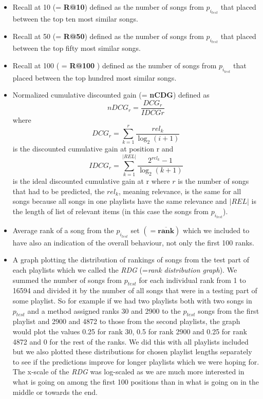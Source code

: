 \begin{itemize}
    \item Recall at 10 (= \textbf{R@10}) defined as the number of songs from $p_{i_{test}} $ that placed between the top ten most similar songs.
    \item Recall at 50 (= \textbf{R@50}) defined as the number of songs from $p_{i_{test}} $ that placed between the top fifty most similar songs.
    \item Recall at 100 ( = \textbf{R@100} ) defined as the number of songs from $p_{i_{test}} $ that placed between the top hundred most similar songs.
    \item Normalized cumulative discounted gain (= \textbf{nCDG}) defined as 
    $${nDCG_{r}} = \frac{DCG_{r}}{IDCG{r}} $$
    where 
    $${DCG_{r}} =\sum_{k=1}^{r}{\frac {rel_{k}}{\log _{2}(i+1)}} $$ 
    is the discounted cumulative gain at position r and 
    $$ {IDCG_{r}} =\sum _{k=1}^{|REL|}{\frac {2^{rel_{k}}-1}{\log _{2}(k+1)}} $$
    is the ideal discounted cumulative gain at r
    where $r$ is the number of songs that had to be predicted, the $rel_k$, meaning relevance, is the same for all songs because all songs in one playlists have the same relevance and $|REL|$ is the length of list of relevant items (in this case the songs from $p_{i_{test}}$).
    \item Average rank of a song from the $p_{i_{test}}$ set $ \boldsymbol{ (= \overline{rank})} $ which we included to have also an indication of the overall behaviour, not only the first 100 ranks.
    \item A graph plotting the distribution of rankings of songs from the test part of each playlists which we called the \textit{RDG} (=\textit{rank distribution graph}). We summed the number of songs from $p_{test}$ for each individual rank from 1 to 16594 and divided it by the number of all songs that were in a testing part of some playlist. So for example if we had two playlists both with two songs in $p_{test}$ and a method assigned ranks 30 and 2900 to the $p_{test}$ songs from the first playlist and 2900 and 4872 to those from the second playlists, the graph would plot the values 0.25 for rank 30, 0.5 for rank 2900 and 0.25 for rank 4872 and 0 for the rest of the ranks. We did this with all playlists included but we also plotted these distributions for chosen playlist lengths separately to see if the predictions improve for longer playlists which we were hoping for. The x-scale of the \textit{RDG} was log-scaled as we are much more interested in what is going on among the first 100 positions than in what is going on in the middle or towards the end. \\
\end{itemize}
